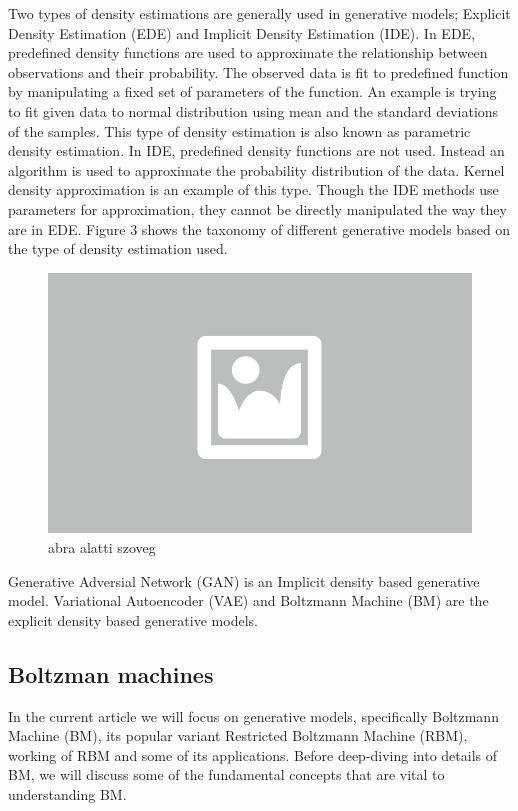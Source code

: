 Two types of density estimations are generally used in generative models; Explicit Density Estimation (EDE) and Implicit Density Estimation (IDE). In EDE, predefined density functions are used to approximate the relationship between observations and their probability. The observed data is fit to predefined function by manipulating a fixed set of parameters of the function. An example is trying to fit given data to normal distribution using mean and the standard deviations of the samples. This type of density estimation is also known as parametric density estimation. In IDE, predefined density functions are not used. Instead an algorithm is used to approximate the probability distribution of the data. Kernel density approximation is an example of this type. Though the IDE methods use parameters for approximation, they cannot be directly manipulated the way they are in EDE. Figure 3 shows the taxonomy of different generative models based on the type of density estimation used.

\begin{figure}[ht]
	\centering
	\includegraphics[width=0.65\columnwidth]{figures/abra.png}
	\caption{abra alatti szoveg}
\end{figure}

Generative Adversial Network (GAN) is an Implicit density based generative model. Variational Autoencoder (VAE) and Boltzmann Machine (BM) are the explicit density based generative models.  


\subsection{Boltzman machines}

In the current article we will focus on generative models, specifically Boltzmann Machine (BM), its popular variant Restricted Boltzmann Machine (RBM), working of RBM and some of its applications. Before deep-diving into details of BM, we will discuss some of the fundamental concepts that are vital to understanding BM. 

